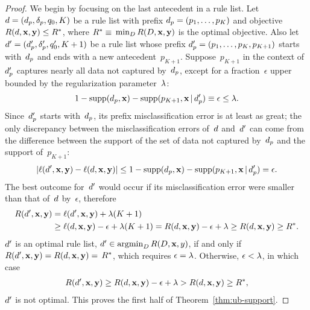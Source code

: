 \begin{arxiv}
\begin{proof}
We begin by focusing on the last antecedent in a rule list.
%
Let ${{d} = (d_p, \delta_p, q_0, K)}$
be a rule list with prefix ${d_p = (p_1, \dots, p_K)}$
and objective ${R({d}, \mathbf{x}, \mathbf{y}) \le R^*}$, where
${R^* \equiv}$ ${\min_{{D}} R({D}, \mathbf{x}, \mathbf{y})}$
is the optimal objective.
%
Also let ${{d}' = (d_p', \delta_p', q_0', K + 1)}$
be a rule list whose prefix ${d_p' = (p_1, \dots, p_K, p_{K+1})}$
starts with~$d_p$ and ends with a new antecedent~$p_{K+1}$.
%
Suppose~$p_{K+1}$ in the context of~$d_p'$ captures nearly all
data not captured by~$d_p$, except for a fraction~$\epsilon$
upper bounded by the regularization parameter~${\lambda}$:
\begin{align}
1 - \textnormal{supp}(d_p, \mathbf{x}) - \textnormal{supp}(p_{K+1}, \mathbf{x} \,|\, d_p') \equiv \epsilon \le {\lambda}.
\end{align}
%
Since~$d_p'$ starts with~$d_p$,
its prefix misclassification error is at least as great;
the only discrepancy between the misclassification errors
of~${d}$ and~${d}'$ can come from the difference between the support of
the set of data not captured by~$d_p$ and the support of~$p_{K+1}$:
\begin{align}
| \ell({d}', \mathbf{x}, \mathbf{y}) - \ell({d}, \mathbf{x}, \mathbf{y}) | \le
1 - \textnormal{supp}(d_p, \mathbf{x}) - \textnormal{supp}(p_{K+1}, \mathbf{x} \,|\, d_p') = \epsilon.
\end{align}
The best outcome for~${d}'$ would occur if its misclassification
error were smaller than that of~${d}$ by~$\epsilon$,
%
therefore
\begin{align}
R({d}', \mathbf{x}, \mathbf{y}) &= \ell({d}', \mathbf{x}, \mathbf{y}) + {\lambda} (K+1) \nonumber \\
&\ge \ell({d}, \mathbf{x}, \mathbf{y}) - \epsilon + {\lambda}(K+1)
= R({d}, \mathbf{x}, \mathbf{y}) - \epsilon + {\lambda} \ge R({d}, \mathbf{x}, \mathbf{y}) \ge R^*.
\end{align}
${d}'$ is an optimal rule list,
\ie ${{d}' \in \operatorname*{argmin}_{{D}} R({D}, \mathbf{x}, y)}$,
if and only if ${R({d}', \mathbf{x}, \mathbf{y}) = R({d}, \mathbf{x}, \mathbf{y}) =}$ ${R^*}$,
which requires ${\epsilon = {\lambda}}$.
%
Otherwise, ${\epsilon < {\lambda}}$, in which case
\begin{align}
R({d}', \mathbf{x}, \mathbf{y}) \ge R({d}, \mathbf{x}, \mathbf{y}) - \epsilon + {\lambda}
> R({d}, \mathbf{x}, \mathbf{y}) \ge R^*,
\end{align}
\ie ${d}'$ is not optimal.
%
This proves the first half of Theorem~\ref{thm:ub-support}.


\end{proof}
\end{arxiv}
